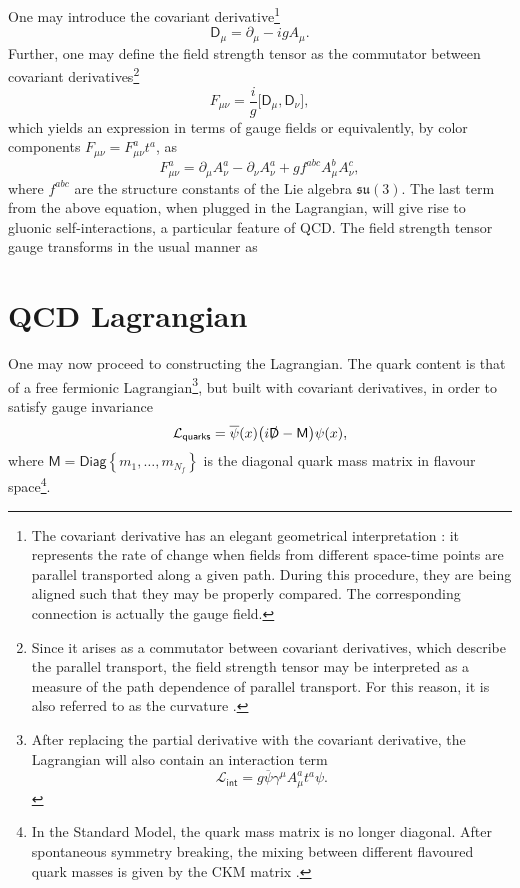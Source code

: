 One may introduce the covariant derivative\footnote{The covariant derivative has an elegant geometrical interpretation \cite{torre}: it represents the rate of change when fields from different space-time points are parallel transported along a given path. During this procedure, they are being aligned such that they may be properly compared. The corresponding connection is actually the gauge field.}
\begin{equation*}
    \textsf{D}_\mu=\partial_\mu-igA_\mu. 
\end{equation*}
Further, one may define the field strength tensor as the commutator between covariant derivatives\footnote{Since it arises as a commutator between covariant derivatives, which describe the parallel transport, the field strength tensor may be interpreted as a measure of the path dependence of parallel transport. For this reason, it is also referred to as the curvature \cite{torre}.}
\begin{equation*}
    F_{\mu\nu}=\frac{i}{g}\big[\textsf{D}_\mu,\textsf{D}_\nu\big],
\end{equation*}
which yields an expression in terms of gauge fields
or equivalently, by color components $F_{\mu\nu}=F_{\mu\nu}^at^a$, as
\begin{equation*}
    F_{\mu\nu}^a=\partial_\mu A_\nu^a-\partial_\nu A_\nu^a+gf^{abc}A_\mu^bA_\nu^c,
\end{equation*}
where $f^{abc}$ are the structure constants of the Lie algebra $\mathfrak{su}(3)$. The last term from the above equation, when plugged in the Lagrangian, will give rise to gluonic self-interactions, a particular feature of QCD. The field strength tensor gauge transforms in the usual manner as

\section{QCD Lagrangian} 
One may now proceed to constructing the Lagrangian. The quark content is that of a free fermionic Lagrangian\footnote{After replacing the partial derivative with the covariant derivative, the Lagrangian will also contain an interaction term
\begin{equation*}
    \mathcal{L}_{\textsf{int}}=g \overline{\psi} \gamma^\mu A_\mu^a t^a \psi.
\end{equation*}}, but built with covariant derivatives, in order to satisfy gauge invariance
\begin{equation*}
    \mathcal{L}_{\textsf{quarks}}=\overline{\psi}(x)\big(i\slashed{\textsf{D}}-\textsf{M}\big)\psi(x),
\end{equation*}
where $\textsf{M}=\textsf{Diag}\left\{m_1,\ldots,m_{N_f}\right\}$ is the diagonal quark mass matrix in flavour space\footnote{In the Standard Model, the quark mass matrix is no longer diagonal. After spontaneous symmetry breaking, the mixing between different flavoured quark masses is given by the {\sffamily CKM} matrix \cite{pdg}.}. 

